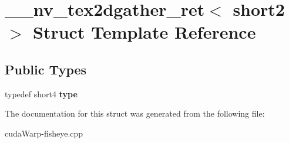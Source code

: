 \hypertarget{struct____nv__tex2dgather__ret_3_01short2_01_4}{}\section{\+\_\+\+\_\+nv\+\_\+tex2dgather\+\_\+ret$<$ short2 $>$ Struct Template Reference}
\label{struct____nv__tex2dgather__ret_3_01short2_01_4}
\subsection*{Public Types}
\begin{DoxyCompactItemize}
\item 
typedef short4 {\bfseries type}\hypertarget{struct____nv__tex2dgather__ret_3_01short2_01_4_a1fee7416915075b9c67ec13290bcb2b5}{}\label{struct____nv__tex2dgather__ret_3_01short2_01_4_a1fee7416915075b9c67ec13290bcb2b5}

\end{DoxyCompactItemize}


The documentation for this struct was generated from the following file\+:\begin{DoxyCompactItemize}
\item 
cuda\+Warp-\/fisheye.\+cpp\end{DoxyCompactItemize}
